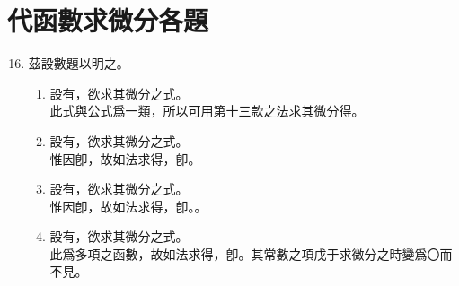 \section{代函數求微分各題}

\begin{enumerate} [label={第\chinese*款},nolistsep]
	\setcounter{enumi}{15}
	\item 茲設數題以明之。
	\begin{enumerate} [label={\chinese*題}]
	\item 設有\CJKmove，欲求其微分之式。\\
		  此式與公式\CJKmove 爲一類，所以可用第十三款之法求其微分得\CJKmove。
	\item 設有\CJKmove，欲求其微分之式。\\
	惟因\CJKmove 卽\CJKmove，故如法求得\CJKmove，卽\CJKmove。
	\item 設有\CJKmove，欲求其微分之式。\\
	惟因\CJKmove 卽\CJKmove，故如法求得\CJKmove，卽。\CJKmove。
	\item 設有\CJKmove，欲求其微分之式。\\
	此爲多項之函數，故如法求得\CJKmove，卽\CJKmove。其常數之項戊于求微分之時變爲〇而不見。

\end{enumerate}
\end{enumerate}
